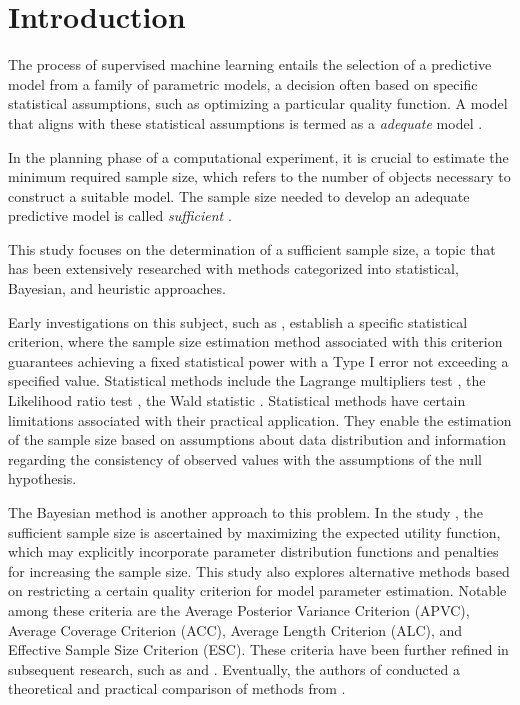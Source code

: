 \documentclass[
11pt,%
tightenlines,%
twoside,%
onecolumn,%
nofloats,%
nobibnotes,%
nofootinbib,%
superscriptaddress,%
noshowpacs,%
centertags]%
{revtex4-2}
\begin{document}
\maketitle


\section{Introduction}

The process of supervised machine learning entails the selection of a predictive model from a family of parametric models, a decision often based on specific statistical assumptions, such as optimizing a particular quality function. A model that aligns with these statistical assumptions is termed as a \textit{adequate} model \cite{bies2006genetic, cawley2010over, raschka2018model}.

In the planning phase of a computational experiment, it is crucial to estimate the minimum required sample size, which refers to the number of objects necessary to construct a suitable model. The sample size needed to develop an adequate predictive model is called \textit{sufficient} \cite{byrd2012sample, figueroa2012predicting, balki2019sample}. 

This study focuses on the determination of a sufficient sample size, a topic that has been extensively researched with methods categorized into statistical, Bayesian, and heuristic approaches.

Early investigations on this subject, such as \cite{Adcock1988, Joseph1995}, establish a specific statistical criterion, where the sample size estimation method associated with this criterion guarantees achieving a fixed statistical power with a Type I error not exceeding a specified value. Statistical methods include the Lagrange multipliers test \cite{self1988power}, the Likelihood ratio test \cite{shieh2000power}, the Wald statistic \cite{shieh2005power}. Statistical methods have certain limitations associated with their practical application. They enable the estimation of the sample size based on assumptions about data distribution and information regarding the consistency of observed values with the assumptions of the null hypothesis.

The Bayesian method is another approach to this problem. In the study \cite{Lindley1997}, the sufficient sample size is ascertained by maximizing the expected utility function, which may explicitly incorporate parameter distribution functions and penalties for increasing the sample size. This study also explores alternative methods based on restricting a certain quality criterion for model parameter estimation. Notable among these criteria are the Average Posterior Variance Criterion (APVC), Average Coverage Criterion (ACC), Average Length Criterion (ALC), and Effective Sample Size Criterion (ESC). These criteria have been further refined in subsequent research, such as \cite{PhamGia1997} and \cite{Gelfand2002}. Eventually, the authors of \cite{Cao2009} conducted a theoretical and practical comparison of methods from \cite{Adcock1988, Joseph1995, Lindley1997}.
\end{document}
